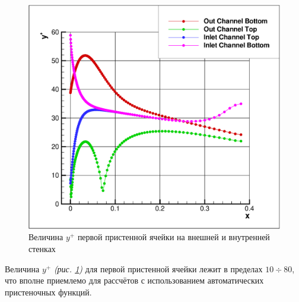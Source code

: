 \begin{figure}[h]
	\centering
	\includegraphics[scale=0.4]{uDuctyplus}
	\caption{Величина $y^{+}$ первой пристенной ячейки на внешней и внутренней стенках}
	\label{fig:uDuctyplus}
\end{figure}
	
Величина $y^{+}$ \textit{(рис. \ref{fig:uDuctyplus})} для первой пристенной ячейки лежит в пределах $10 \div 80$, что вполне приемлемо для рассчётов с использованием автоматических пристеночных функций.